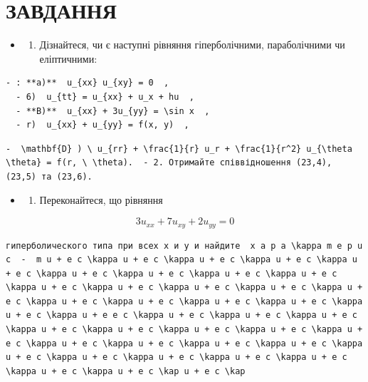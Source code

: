 \documentclass[
  ukrainian,
]{article}
\providecommand{\tightlist}{%
  \setlength{\itemsep}{0pt}\setlength{\parskip}{0pt}}
\begin{document}
\section{ЗАВДАННЯ}\label{ux437ux430ux432ux434ux430ux43dux43dux44f-10}

\begin{itemize}
\tightlist
\item
  \begin{enumerate}
  \def\labelenumi{\arabic{enumi}.}
  \tightlist
  \item
    Дізнайтеся, чи є наступні рівняння гіперболічними, параболічними чи
    еліптичними:
  \end{enumerate}
\end{itemize}

\begin{verbatim}
- : **a)**  u_{xx} u_{xy} = 0  ,
  - 6)  u_{tt} = u_{xx} + u_x + hu  ,
  - **B)**  u_{xx} + 3u_{yy} = \sin x  ,
  - r)  u_{xx} + u_{yy} = f(x, y)  ,
\end{verbatim}

\begin{verbatim}
-  \mathbf{D} ) \ u_{rr} + \frac{1}{r} u_r + \frac{1}{r^2} u_{\theta \theta} = f(r, \ \theta).  - 2. Отримайте співвідношення (23,4), (23,5) та (23,6).
\end{verbatim}

\begin{itemize}
\tightlist
\item
  \begin{enumerate}
  \def\labelenumi{\arabic{enumi}.}
  \setcounter{enumi}{2}
  \tightlist
  \item
    Переконайтеся, що рівняння
  \end{enumerate}
\end{itemize}

\[
3u_{xx} + 7u_{xy} + 2u_{yy} = 0
\]

\begin{verbatim}
гиперболического типа при всех x и y и найдите  x a p a \kappa m e p u c  -  m u + e c \kappa u + e c \kappa u + e c \kappa u + e c \kappa u + e c \kappa u + e c \kappa u + e c \kappa u + e c \kappa u + e c \kappa u + e c \kappa u + e c \kappa u + e c \kappa u + e c \kappa u + e c \kappa u + e c \kappa u + e c \kappa u + e c \kappa u + e c \kappa u + e c \kappa u + e e c \kappa u + e c \kappa u + e c \kappa u + e c \kappa u + e c \kappa u + e c \kappa u + e c \kappa u + e c \kappa u + e c \kappa u + e c \kappa u + e c \kappa u + e c \kappa u + e c \kappa u + e c \kappa u + e c \kappa u + e c \kappa u + e c \kappa u + e c \kappa u + e c \kappa u + e c \kap u + e c \kap
\end{verbatim}
\end{document}
